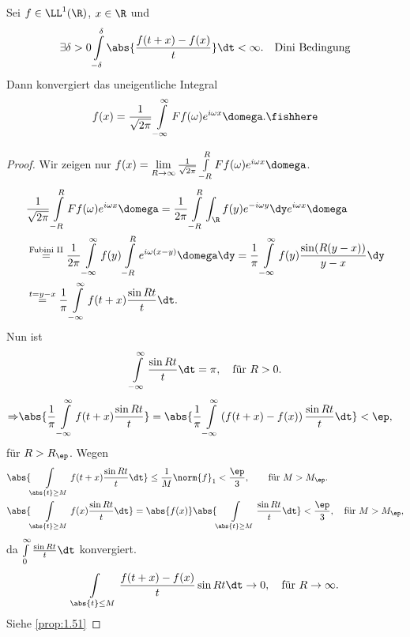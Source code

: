 \begin{prop}
\label{prop:2.32}
Sei $f\in\LL^1(\R)$, $x\in\R$ und
\begin{align*}
\exists \delta > 0 \int\limits_{-\delta}^\delta 
\abs{\frac{f(t+x)-f(x)}{t}}\dt < \infty.\quad\text{Dini Bedingung}
\end{align*}
Dann konvergiert das uneigentliche Integral
\begin{align*}
f(x) = \frac{1}{\sqrt{2\pi}}\int\limits_{-\infty}^\infty Ff(\omega)e^{i\omega
x}\domega.\fishhere
\end{align*}
\end{prop}
\begin{proof}
Wir zeigen nur $f(x) = \lim\limits_{R\to\infty} \frac{1}{\sqrt{2\pi}}
\int\limits_{-R}^R Ff(\omega)e^{i\omega
x}\domega$.
\begin{align*}
&\frac{1}{\sqrt{2\pi}}\int\limits_{-R}^R Ff(\omega)e^{i\omega x}\domega =
\frac{1}{2\pi} \int\limits_{-R}^R \int_\R f(y)e^{-i\omega y}\dy e^{i\omega
x}\domega
\\ &
\overset{\text{Fubini II}}{=} \frac{1}{2\pi} 
\int\limits_{-\infty}^\infty f(y) 
\int\limits_{-R}^R e^{i\omega(x-y)}\domega \dy
= \frac{1}{\pi}\int\limits_{-\infty}^\infty f(y)\frac{\sin(R(y-x))}{y-x}\dy\\
&\overset{t=y-x}{=} \frac{1}{\pi} \int\limits_{-\infty}^\infty f(t+x)\frac{\sin
Rt}{t}\dt.
\end{align*}
Nun ist
\begin{align*}
&\int\limits_{-\infty}^\infty \frac{\sin Rt}{t}\dt = \pi,\quad \text{für }R>0.\\
\end{align*}
\begin{align*}
\Rightarrow & 
\abs{\frac{1}{\pi}\int\limits_{-\infty}^\infty f(t+x)\frac{\sin Rt}{t}} =
\abs{\frac{1}{\pi} \int\limits_{-\infty}^\infty \left(f(t+x)-f(x)\right)
\frac{\sin Rt}{t}\dt} < \ep,
\end{align*}
für $R > R_\ep$. Wegen
\begin{align*}
&\abs{\int\limits_{\abs{t}\ge M} f(t+x)\frac{\sin Rt}{t}\dt }
\le \frac{1}{M} \norm{f}_1 < \frac{\ep}{3},\qquad\text{für }M>M_\ep.\\
&\abs{\int\limits_{\abs{t}\ge M} f(x)\frac{\sin Rt}{t}\dt}  = 
\abs{f(x)}\abs{\int\limits_{\abs{t}\ge M} \frac{\sin Rt}{t} \dt} <
\frac{\ep}{3},\quad\text{für } M>M_\ep,
\end{align*}
da $\int\limits_0^\infty \frac{\sin Rt}{t}\dt $ konvergiert.
\begin{align*}
\int\limits_{\abs{t}\le M}\frac{f(t+x)-f(x)}{t}\sin Rt\dt \to 0,\quad \text{für
}R\to\infty.
\end{align*}
Siehe \ref{prop:1.51}\qedhere
\end{proof}

